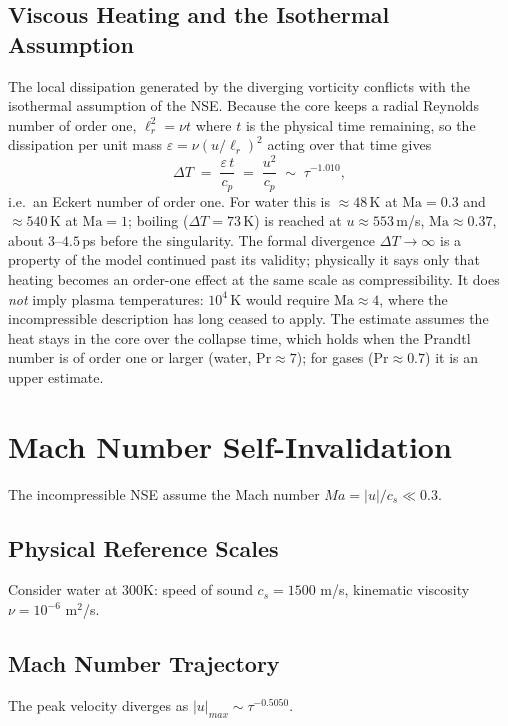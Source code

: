 \documentclass[11pt,a4paper]{article}
\theoremstyle{definition}
\begin{document}
\subsection{Viscous Heating and the Isothermal Assumption}
The local dissipation generated by the diverging vorticity conflicts with the isothermal assumption of the NSE. Because the core keeps a radial Reynolds number of order one, $\ell_r^2 = \nu t$ where $t$ is the physical time remaining, so the dissipation per unit mass $\varepsilon = \nu(u/\ell_r)^2$ acting over that time gives
\begin{equation}
  \Delta T \;=\; \frac{\varepsilon\, t}{c_p} \;=\; \frac{u^2}{c_p} \;\sim\; \tau^{-1.010},
\end{equation}
i.e.\ an Eckert number of order one. For water this is $\approx 48$\,K at $\mathrm{Ma}=0.3$ and $\approx 540$\,K at $\mathrm{Ma}=1$; boiling ($\Delta T = 73$\,K) is reached at $u \approx 553$\,m/s, $\mathrm{Ma}\approx0.37$, about $3$--$4.5$\,ps before the singularity. The formal divergence $\Delta T\to\infty$ is a property of the model continued past its validity; physically it says only that heating becomes an order-one effect at the same scale as compressibility. It does \emph{not} imply plasma temperatures: $10^4$\,K would require $\mathrm{Ma}\approx4$, where the incompressible description has long ceased to apply. The estimate assumes the heat stays in the core over the collapse time, which holds when the Prandtl number is of order one or larger (water, $\mathrm{Pr}\approx7$); for gases ($\mathrm{Pr}\approx0.7$) it is an upper estimate.

\section{Mach Number Self-Invalidation}

The incompressible NSE assume the Mach number $Ma = |u|/c_s \ll 0.3$. 

\subsection{Physical Reference Scales}
Consider water at 300K: speed of sound $c_s = 1500$ m/s, kinematic viscosity $\nu = 10^{-6}$ m$^2$/s.

\subsection{Mach Number Trajectory}
The peak velocity diverges as $|u|_{max} \sim \tau^{-0.5050}$. 
\end{document}
